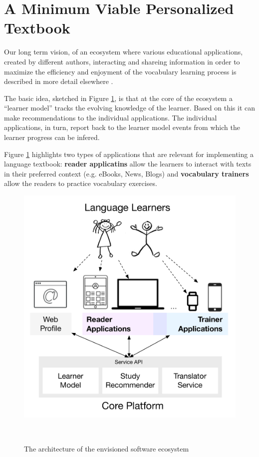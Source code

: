 
\newpage
\section{A Minimum Viable Personalized Textbook}
\label{sec:system}

Our long term vision, of an ecosystem where various educational applications, created by different authors, interacting and shareing information in order to maximize the efficiency and enjoyment of the vocabulary learning process is described in more detail elsewhere \cite{Lungu16}. 

The basic idea, sketched in Figure \ref{fig:architecture}, is that at the core of the ecosystem a ``learner model'' tracks the evolving knowledge of the learner. Based on this it can make recommendations to the individual applications. The individual applications, in turn, report back to the learner model events from which the learner progress can be infered. 

Figure \ref{fig:architecture} highlights two types of applications that are relevant for implementing a language textbook: {\bf reader applicatins} allow the learners to interact with texts in their preferred context (e.g. eBooks, News, Blogs) and {\bf vocabulary trainers} allow the readers to practice vocabulary exercises. 

\begin{figure}[h!]
\centering
  \includegraphics[width=0.9\columnwidth]{figures/zeeguu-architecture.pdf}
  \caption{The architecture of the envisioned software ecosystem}~\label{fig:architecture}
\end{figure}



